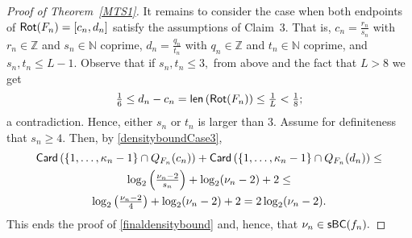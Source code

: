 \documentclass[a4paper, 11pt]{amsart}
\numberwithin{equation}{section}
\theoremstyle{customnumberedtheorem}
\theoremstyle{definitionwithbfnote}
\newcommand{\N}{\ensuremath{\mathbb{N}}}
\newcommand{\Z}{\ensuremath{\mathbb{Z}}}
\DeclareMathOperator{\len}{\textsf{\upshape len}}
\DeclareMathOperator{\Rot}{\textsf{\upshape Rot}}
\DeclareMathOperator{\Card}{\textsf{\upshape Card}}
\DeclareMathOperator{\sbcset}{\textsf{\upshape sBC}}
\begin{document}
\begin{proof}[Proof of Theorem~\ref{MTS1}]
It remains to consider the case when both endpoints of
$\Rot(F_n) = [c_n, d_n]$ satisfy the assumptions of Claim~3.
That is,
$c_n = \tfrac{r_n}{s_n}$ with $r_n\in\Z$ and $s_n\in \N$ coprime,
$d_n = \tfrac{q_n}{t_n}$ with $q_n\in\Z$ and $t_n\in \N$ coprime, and $s_n,t_n \le L-1.$
Observe that if $s_n,t_n \le 3,$ from above and the fact that $L > 8$ we get
\[
  \tfrac{1}{6} \le d_n - c_n = \len\left(\Rot(F_n)\right) \le \tfrac{1}{L} < \tfrac{1}{8};
\]
a contradiction. Hence, either $s_n$ or $t_n$ is larger than 3.
Assume for definiteness that $s_n \ge 4.$
Then, by \eqref{densityboundCase3},
\begin{multline*}
  \Card\left(\{1,\dots, \kappa_n-1\} \cap Q_{F_n}(c_n) \right) + \Card\left(\{1,\dots, \kappa_n-1\} \cap Q_{F_n}(d_n)\right) \le \\
  \log_2\left(\tfrac{\nu_n - 2}{s_n}\right) + \log_2(\nu_n - 2) + 2 \le \\
     \log_2\left(\tfrac{\nu_n - 2}{4}\right) + \log_2(\nu_n - 2) + 2 =  %
     2\log_2(\nu_n - 2).
\end{multline*}
This ends the proof of \eqref{finaldensitybound} and, hence,
that $\nu_n \in \sbcset(f_n).$
\end{proof}



%
\end{document}
